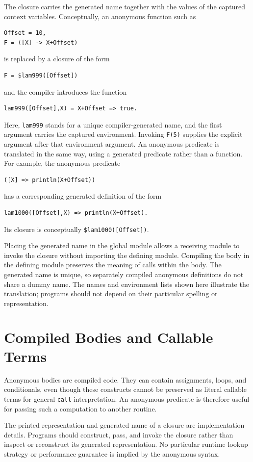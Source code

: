 The closure carries the generated name together with the values of the
captured context variables. Conceptually, an anonymous function such as
\begin{verbatim}
Offset = 10,
F = ([X] -> X+Offset)
\end{verbatim}
is replaced by a closure of the form
\begin{verbatim}
F = $lam999([Offset])
\end{verbatim}
and the compiler introduces the function
\begin{verbatim}
lam999([Offset],X) = X+Offset => true.
\end{verbatim}
Here, \texttt{lam999} stands for a unique compiler-generated name, and the
first argument carries the captured environment. Invoking \texttt{F(5)}
supplies the explicit argument after that environment argument. An anonymous
predicate is translated in the same way, using a generated predicate rather
than a function. For example, the anonymous predicate
\begin{verbatim}
([X] => println(X+Offset))
\end{verbatim}
has a corresponding generated definition of the form
\begin{verbatim}
lam1000([Offset],X) => println(X+Offset).
\end{verbatim}
Its closure is conceptually \texttt{\$lam1000([Offset])}.

Placing the generated name in the global module allows a receiving module
to invoke the closure without importing the defining module. Compiling the
body in the defining module preserves the meaning of calls within the body.
The generated name is unique, so separately compiled anonymous definitions
do not share a dummy name. The names and environment lists shown here
illustrate the translation; programs should not depend on their particular
spelling or representation.

\section{Compiled Bodies and Callable Terms}
Anonymous bodies are compiled code. They can contain assignments, loops, and
conditionals, even though these constructs cannot be preserved as literal
callable terms for general \texttt{call} interpretation. An anonymous
predicate is therefore useful for passing such a computation to another
routine.

The printed representation and generated name of a closure are implementation
details. Programs should construct, pass, and invoke the closure rather than
inspect or reconstruct its generated representation. No particular runtime
lookup strategy or performance guarantee is implied by the anonymous syntax.
